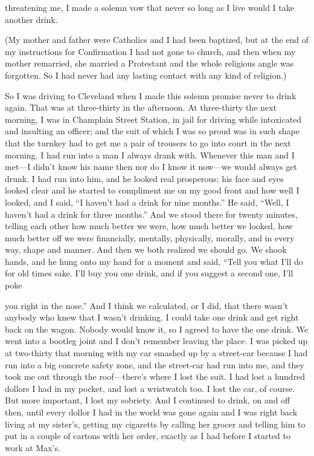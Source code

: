\begin{biblechapter}
threatening me, I made a solemn vow that never so long as I live would I take another drink.

(My mother and father were Catholics and I had been baptized, but at the end of my instructions for Confirmation I had not gone to church, and then when my mother remarried, she married a Protestant and the whole religious angle was forgotten. So I had never had any lasting contact with any kind of religion.)

So I was driving to Cleveland when I made this solemn promise never to drink again. That was at three-thirty in the afternoon. At three-thirty the next morning, I was in Champlain Street Station, in jail for driving while intoxicated and insulting an officer; and the suit of which I was so proud was in such shape that the turnkey had to get me a pair of trousers to go into court in the next morning. I had run into a man I always drank with. Whenever this man and I met—I didn’t know his name then nor do I know it now—we would always get drunk. I had run into him, and he looked real prosperous; his face and eyes looked clear and he started to compliment me on my good front and how well I looked, and I said, “I haven’t had a drink for nine months.” He said, “Well, I haven’t had a drink for three months.” And we stood there for twenty minutes, telling each other how much better we were, how much better we looked, how much better off we were financially, mentally, physically, morally, and in every way, shape and manner. And then we both realized we should go. We shook hands, and he hung onto my hand for a moment and said, “Tell you what I’ll do for old times sake. I’ll buy you one drink, and if you suggest a second one, I’ll poke

you right in the nose.” And I think we calculated, or I did, that there wasn’t anybody who knew that I wasn’t drinking. I could take one drink and get right back on the wagon. Nobody would know it, so I agreed to have the one drink. We went into a bootleg joint and I don’t remember leaving the place. I was picked up at two-thirty that morning with my car smashed up by a street-car because I had run into a big concrete safety zone, and the street-car had run into me, and they took me out through the roof—there’s where I lost the suit. I had lost a hundred dollors I had in my pocket, and lost a wristwatch too. I lost the car, of course. But more important, I lost my sobriety. And I continued to drink, on and off then, until every dollor I had in the world was gone again and I was right back living at my sister’s, getting my cigaretts by calling her grocer and telling him to put in a couple of cartons with her order, exactly as I had before I started to work at Max’s.


\end{biblechapter}
